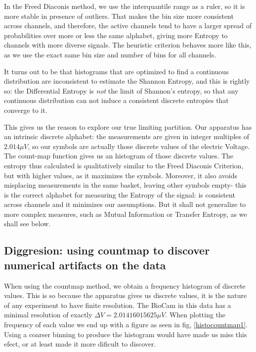 \documentclass[10pt]{article}
\begin{document}
In the Freed Diaconis method, we use the interquantile range as a ruler, so it is more stable in presence of outliers. That makes the bin size more consistent across channels, and therefore, the active channels tend to have a larger spread of probabilities over more or less the same alphabet, giving more Entropy to channels with more diverse signals. The heuristic criterion behaves more like this, as we use the exact same bin size and number of bins for all channels. 

It turns out to be that histograms that are optimized to find a continuous distribution are inconsistent to estimate the Shannon Entropy, and this is rightly so: the Differential Entropy is \emph{not} the limit of Shannon's entropy, so that any continuous distribution can not induce a consistent discrete entropies that converge to it. 

This gives us the reason to explore our true limiting partition. Our apparatus has an intrinsic discrete alphabet: the measurements are given in integer multiples of $2.014 \mu V$, so our symbols are actually those discrete values of the electric Voltage. The count-map function gives us an histogram of those discrete values. The entropy thus calculated is qualitatively similar to the Freed Diaconis Criterion, but with higher values, as it maximizes the symbols. Moreover, it also avoids misplacing measurements in the same basket, leaving other symbols empty- this is the correct alphabet for measuring the Entropy of
the signal: is consistent across channels and it minimizes our assumptions. But it shall
not generalize to more complex measures, such as Mutual Information or
Transfer Entropy, as we shall see below.

\subsection{Diggresion: using countmap to discover numerical artifacts on
  the data}

When using the countmap method, we obtain a frequency histogram of discrete values.
This is so because the apparatus gives us discrete values, it is the nature
of any experiment to have finite resolution. The BioCam in this data has a
minimal resolution of exactly $\Delta V=2.01416015625 \mu V $.
When plotting the frequency
of each value we end up with a figure as seen in fig, \ref{histocountmap1}.
Using a coarser binning to produce the histogram would have made us miss
this efect, or at least made it more dificult to discover. 
\end{document}
